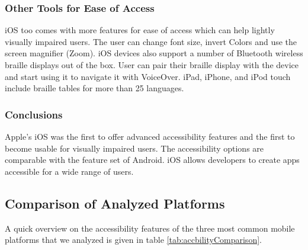 \subsubsection{Other Tools for Ease of Access}
iOS too comes with more features for ease of access which can help lightly visually impaired users. The user can change font size, invert Colors and use the screen magnifier (Zoom).
iOS devices also support a number of Bluetooth wireless braille displays out of the box. User can pair their braille display with the device and start using it to navigate it with VoiceOver. iPad, iPhone, and iPod touch include braille tables for more than 25 languages.

\subsubsection{Conclusions}
Apple's iOS was the first to offer advanced accessibility features and the first to become usable for visually impaired users. The accessibility options are comparable with the  feature set of Android. iOS allows developers to create apps accessible for a wide range of users.

\subsection{Comparison of Analyzed Platforms}
A quick overview on the accessibility features of the three most common mobile platforms that we analyzed is given in table \ref{tab:accbilityComparison}.



